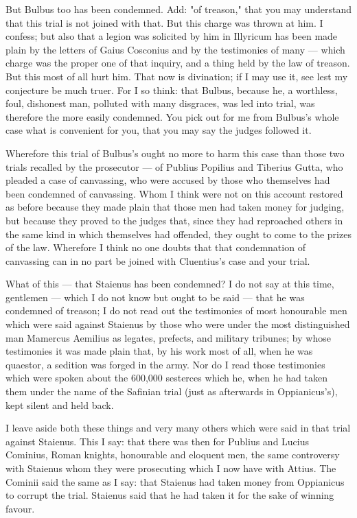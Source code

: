  But Bulbus too has been condemned. Add: "of treason," that you may understand that this trial is not joined with that. But this charge was thrown at him. I confess; but also that a legion was solicited by him in Illyricum has been made plain by the letters of Gaius Cosconius and by the testimonies of many --- which charge was the proper one of that inquiry, and a thing held by the law of treason. But this most of all hurt him. That now is divination; if I may use it, see lest my conjecture be much truer. For I so think: that Bulbus, because he, a worthless, foul, dishonest man, polluted with many disgraces, was led into trial, was therefore the more easily condemned. You pick out for me from Bulbus's whole case what is convenient for you, that you may say the judges followed it.

 Wherefore this trial of Bulbus's ought no more to harm this case than those two trials recalled by the prosecutor --- of Publius Popilius and Tiberius Gutta, who pleaded a case of canvassing, who were accused by those who themselves had been condemned of canvassing. Whom I think were not on this account restored as before because they made plain that those men had taken money for judging, but because they proved to the judges that, since they had reproached others in the same kind in which themselves had offended, they ought to come to the prizes of the law. Wherefore I think no one doubts that that condemnation of canvassing can in no part be joined with Cluentius's case and your trial.

 What of this --- that Staienus has been condemned? I do not say at this time, gentlemen --- which I do not know but ought to be said --- that he was condemned of treason; I do not read out the testimonies of most honourable men which were said against Staienus by those who were under the most distinguished man Mamercus Aemilius as legates, prefects, and military tribunes; by whose testimonies it was made plain that, by his work most of all, when he was quaestor, a sedition was forged in the army. Nor do I read those testimonies which were spoken about the 600,000 sesterces which he, when he had taken them under the name of the Safinian trial (just as afterwards in Oppianicus's), kept silent and held back.

 I leave aside both these things and very many others which were said in that trial against Staienus. This I say: that there was then for Publius and Lucius Cominius, Roman knights, honourable and eloquent men, the same controversy with Staienus whom they were prosecuting which I now have with Attius. The Cominii said the same as I say: that Staienus had taken money from Oppianicus to corrupt the trial. Staienus said that he had taken it for the sake of winning favour.

